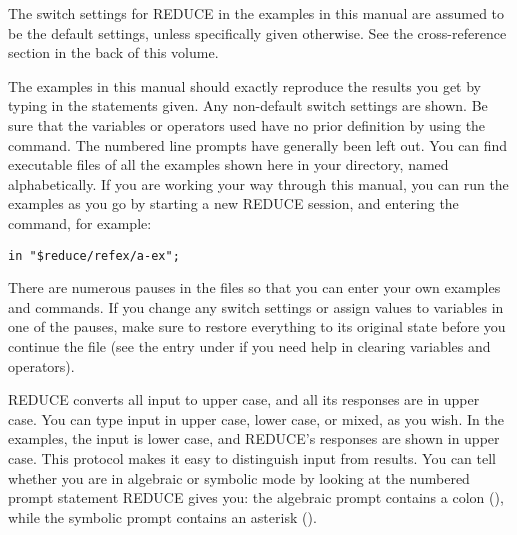 The switch settings for REDUCE in the examples in this manual are assumed to 
be the default settings, unless specifically given otherwise.  See the
cross-reference section  in the back of this volume.

The examples in this manual should exactly reproduce the results you get
by typing in the statements given.  Any non-default switch settings are 
shown.  Be sure that the variables or operators used have no prior definition
by using the  command.  The numbered line prompts have generally
been left out.  You can find executable files of all the examples shown here
in your  directory, named alphabetically.  If you are
working your way through this manual, you can run the examples as you go by
starting a new REDUCE session, and entering the command, for example:
\begin{verbatim}
in "$reduce/refex/a-ex";
\end{verbatim}
There are numerous pauses in the files so that you can enter your own
examples and commands.  If you change any switch settings or assign values
to variables in one of the pauses, make sure to restore everything to its
original state before you continue the file  (see the entry under 
if you need help in clearing variables and operators).

REDUCE converts all input to upper case, and all its responses are in upper
case.  You can type input in  upper case, lower case, or mixed, as you wish.  
In the examples, the input is lower case, and REDUCE's responses are shown in
upper case.  This protocol makes it easy to distinguish input from results.
You can tell whether you are in algebraic or symbolic mode by looking at the
numbered prompt statement REDUCE gives you:  the algebraic prompt contains
a colon (\name{:}), while the symbolic prompt contains an asterisk (\name{*}).



